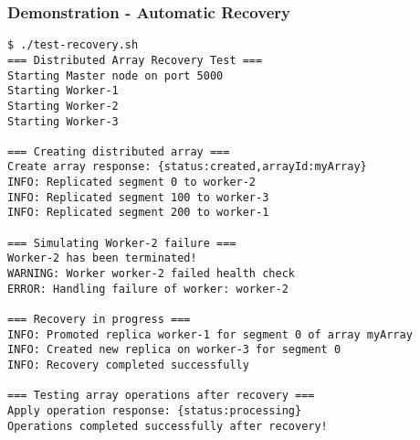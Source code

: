 \documentclass{beamer}
\begin{document}
\begin{frame}[fragile]
\frametitle{Demonstration - Automatic Recovery}
\begin{lstlisting}[style=terminal]
$ ./test-recovery.sh
=== Distributed Array Recovery Test ===
Starting Master node on port 5000
Starting Worker-1
Starting Worker-2
Starting Worker-3

=== Creating distributed array ===
Create array response: {status:created,arrayId:myArray}
INFO: Replicated segment 0 to worker-2
INFO: Replicated segment 100 to worker-3
INFO: Replicated segment 200 to worker-1

=== Simulating Worker-2 failure ===
Worker-2 has been terminated!
WARNING: Worker worker-2 failed health check
ERROR: Handling failure of worker: worker-2

=== Recovery in progress ===
INFO: Promoted replica worker-1 for segment 0 of array myArray
INFO: Created new replica on worker-3 for segment 0
INFO: Recovery completed successfully

=== Testing array operations after recovery ===
Apply operation response: {status:processing}
Operations completed successfully after recovery!
\end{lstlisting}
\end{frame}
\end{document}
